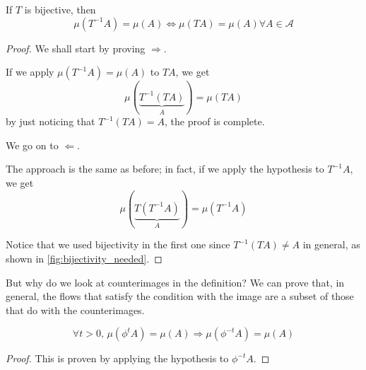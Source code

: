 \begin{proposition}
    If $T$ is bijective, then \begin{equation*}
    \mu(T^{-1}A)=\mu(A)\iff\mu(TA)=\mu(A)\forall A\in\mathcal{A}
    \end{equation*}
\end{proposition}
\begin{proof} 
    We shall start by proving $\Rightarrow$.

    If we apply $\mu(T^{-1}A)=\mu(A)$ to $TA$, we get \begin{equation*}
        \mu(\underbrace{T^{-1}(TA)}_A)=\mu(TA)
    \end{equation*}
    by just noticing that $T^{-1}(TA)=A$, the proof is complete.

    We go on to $\Leftarrow$.
    
    The approach is the same as before; in fact, if we apply the hypothesis to $T^{-1}A$, we get \begin{equation*}
        \mu(\underbrace{T(T^{-1}A)}_A)=\mu(T^{-1}A)
    \end{equation*} 
    
    Notice that we used bijectivity in the first one since $T^{-1}(T A)\neq A$ in general, as shown in \autoref{fig:bijectivity_needed}.
\end{proof}

But why do we look at counterimages in the definition? We can prove that, in general, the flows that satisfy the condition with the image are a subset of those that do with the counterimages.

\begin{proposition}
    \begin{equation*}
        \forall t>0,\, \mu(\phi^{t}A)=\mu(A)\Rightarrow \mu(\phi^{-t} A)=\mu(A)
    \end{equation*}
\end{proposition}
\begin{proof}
    This is proven by applying the hypothesis to $\phi^{-t} A$.
\end{proof}

